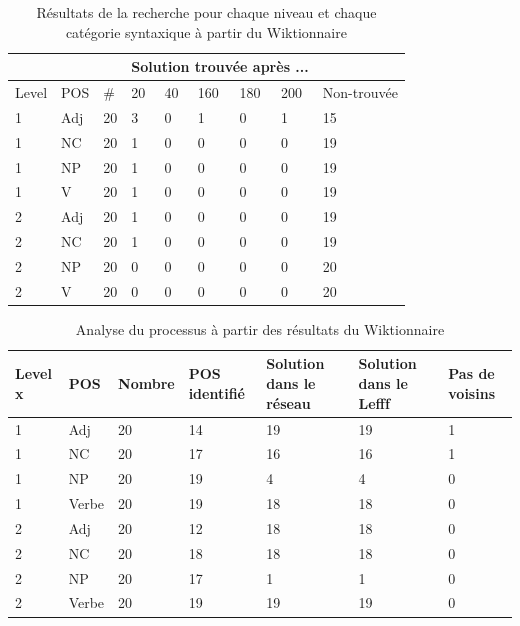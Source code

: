 {\begin{table}[ht]
\centering
\begin{tabular}{|p{0.8cm} |p{0.8cm} |p{0.8cm}| p{0.8cm} |p{0.8cm}|p{0.8cm}|p{0.8cm}|p{0.8cm}|p{2.8cm}}
\hline
 &  &  & \multicolumn{5}{c}{Solution trouvée après ...} & \\[0.5ex]
\hline
Level & POS & \# & 20 & 40 & 160 & 180 & 200 & Non-trouvée\\[0.5ex]
\hline
\hline
1 & Adj & 20 & 3 & 0 & 1 & 0 & 1 & 15 \\[0.5ex]
\hline
1 & NC & 20 & 1 & 0 & 0 & 0 & 0 & 19 \\[0.5ex]
\hline
1 & NP & 20 & 1 & 0 & 0 & 0 & 0 & 19 \\[0.5ex]
\hline
1 & V & 20 & 1 & 0 & 0 & 0 & 0 & 19 \\[0.5ex]
\hline
2 & Adj & 20 & 1 & 0 & 0 & 0 & 0 & 19 \\[0.5ex]
\hline
2 & NC & 20 & 1 & 0 & 0 & 0 & 0 & 19 \\[0.5ex]
\hline
2 & NP & 20 & 0 & 0 & 0 & 0 & 0 & 20 \\[0.5ex]
\hline
2 & V & 20 & 0 & 0 & 0 & 0 & 0 & 20\\[0.5ex]
\hline
\end{tabular}
\caption{Résultats de la recherche pour chaque niveau et chaque catégorie syntaxique à partir du Wiktionnaire}
\label{table:resultscrosswords}
\end{table}

\begin{table}[ht]
\centering
\begin{tabular}{|p{1.8cm}|p{1.8cm}|p{1.8cm}|p{1.8cm}|p{1.8cm}|p{1.8cm}|p{1.8cm}|}
\hline
Level x & POS & Nombre & POS identifié & Solution dans le réseau & Solution dans le Lefff & Pas de voisins\\[0.5ex]
\hline\hline
1 & Adj & 20 & 14 & 19 & 19 & 1 \\[0.5ex]
\hline
1 & NC & 20 & 17 & 16 & 16 & 1 \\[0.5ex] 
\hline
1 & NP & 20 & 19 & 4 & 4 & 0 \\[0.5ex]
\hline
1 & Verbe & 20 & 19 & 18 & 18 & 0 \\[0.5ex]
\hline
2 & Adj & 20 & 12 & 18 & 18 & 0 \\[0.5ex]
\hline
2 & NC & 20 & 18 & 18 & 18 & 0 \\[0.5ex] 
\hline
2 & NP & 20 & 17 & 1 & 1 & 0 \\[0.5ex]
\hline
2 & Verbe & 20 & 19 & 19 & 19 & 0 \\[0.5ex]
\hline
\end{tabular}
\caption{Analyse du processus à partir des résultats du Wiktionnaire}
\label{table:anaprocesscrosswords}
\end{table}

}
